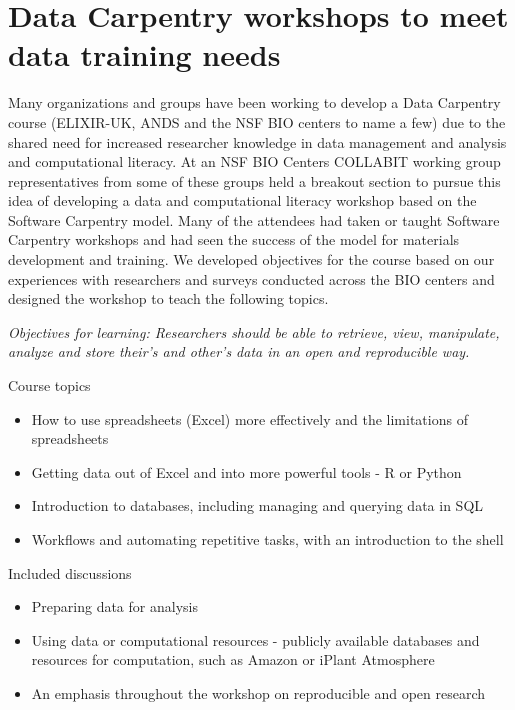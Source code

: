 \documentclass[11pt]{article}
\begin{document}
\section{Data Carpentry workshops to meet data training needs}

Many organizations and groups have been working to develop a Data Carpentry course (ELIXIR-UK, ANDS and the NSF BIO centers to name a few) due to the shared need for increased researcher knowledge in data management and analysis and computational literacy. At an NSF BIO Centers COLLABIT working group representatives from some of these groups held a breakout section to pursue this idea of developing a data and computational literacy workshop based on the Software Carpentry model. Many of the attendees had taken or taught Software Carpentry workshops and
had seen the success of the model for materials development and training. We developed objectives for the course based on our experiences with researchers and surveys conducted across the BIO centers and designed the workshop to teach the following topics.

\emph{Objectives for learning: Researchers should be able to retrieve, view, manipulate, analyze and store their's and other's data in an open and reproducible way.}

Course topics
\begin{itemize}
\item How to use spreadsheets (Excel) more effectively and the limitations of spreadsheets
\item Getting data out of Excel and into more powerful tools - R or Python
\item Introduction to databases, including managing and querying data in SQL
\item Workflows and automating repetitive tasks, with an introduction to the shell
\end{itemize}

Included discussions
\begin{itemize}
\item Preparing data for analysis
\item Using data or computational resources - publicly available databases and resources for computation, such as Amazon or  iPlant Atmosphere
\item An emphasis throughout the workshop on reproducible and open research 
\end{itemize}
\end{document}
